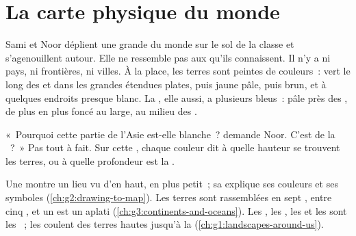 \chapter{La carte physique du monde}\label{ch:g4:world-physical-map}

Sami et Noor déplient une grande  du monde sur le sol de la classe et
s'agenouillent autour. Elle ne ressemble pas aux  qu'ils connaissent.
Il n'y a ni pays, ni frontières, ni villes. À la place, les terres sont
peintes de couleurs~: vert le long des  et dans les grandes étendues
plates, puis jaune pâle, puis brun, et à quelques endroits presque blanc.
La , elle aussi, a plusieurs bleus~: pâle près des , de plus en
plus foncé au large, au milieu des .

«~Pourquoi cette partie de l'Asie est-elle blanche~? demande Noor. C'est de
la ~?~» Pas tout à fait. Sur cette , chaque couleur dit à quelle
hauteur se trouvent les terres, ou à quelle profondeur est la .

\begin{recall}
Une  montre un lieu vu d'en haut, en plus petit~; sa  explique
ses couleurs et ses symboles (\cref{ch:g2:drawing-to-map}). Les terres
sont rassemblées en sept , entre cinq , et un 
est un  aplati (\cref{ch:g3:continents-and-oceans}). Les ,
les , les  et les  sont les ~; les
 coulent des terres hautes jusqu'à la 
(\cref{ch:g1:landscapes-around-us}).
\end{recall}

